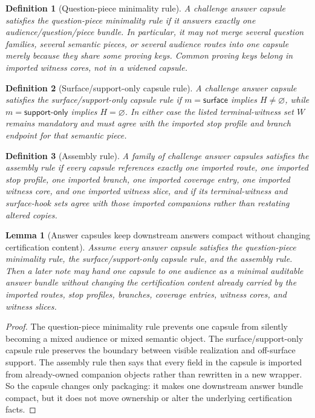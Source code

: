 \documentclass[11pt]{article}
\newtheorem{definition}{Definition}
\newtheorem{lemma}{Lemma}
\begin{document}
\begin{definition}[Question-piece minimality rule]
A challenge answer capsule satisfies the \emph{question-piece minimality rule} if it answers exactly one audience/question/piece bundle.
In particular, it may not merge several question families, several semantic pieces, or several audience routes into one capsule merely because they share some proving keys.
Common proving keys belong in imported witness cores, not in a widened capsule.
\end{definition}

\begin{definition}[Surface/support-only capsule rule]
A challenge answer capsule satisfies the \emph{surface/support-only capsule rule} if $m=\textsf{surface}$ implies $H\neq\varnothing$, while $m=\textsf{support-only}$ implies $H=\varnothing$.
In either case the listed terminal-witness set $W$ remains mandatory and must agree with the imported stop profile and branch endpoint for that semantic piece.
\end{definition}

\begin{definition}[Assembly rule]
A family of challenge answer capsules satisfies the \emph{assembly rule} if every capsule references exactly one imported route, one imported stop profile, one imported branch, one imported coverage entry, one imported witness core, and one imported witness slice, and if its terminal-witness and surface-hook sets agree with those imported companions rather than restating altered copies.
\end{definition}

\begin{lemma}[Answer capsules keep downstream answers compact without changing certification content]
Assume every answer capsule satisfies the question-piece minimality rule, the surface/support-only capsule rule, and the assembly rule.
Then a later note may hand one capsule to one audience as a minimal auditable answer bundle without changing the certification content already carried by the imported routes, stop profiles, branches, coverage entries, witness cores, and witness slices.
\end{lemma}

\begin{proof}
The question-piece minimality rule prevents one capsule from silently becoming a mixed audience or mixed semantic object.
The surface/support-only capsule rule preserves the boundary between visible realization and off-surface support.
The assembly rule then says that every field in the capsule is imported from already-owned companion objects rather than rewritten in a new wrapper.
So the capsule changes only packaging: it makes one downstream answer bundle compact, but it does not move ownership or alter the underlying certification facts.\qedhere
\end{proof}
\end{document}
